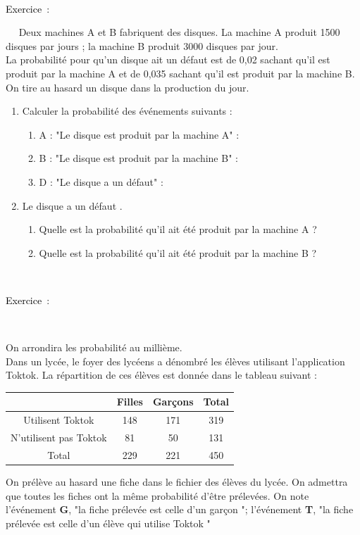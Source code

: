 \documentclass[11pt,a4paper]{article}
\newcounter{numexos}%
\newcommand{\exercice}[1]{%
\addtocounter{numexos}{1}%
\textcolor{black}{\normalsize Exercice\,\thenumexos\,}\,#1%
}
\newcommand{\bex}[2]
{\begin{bclogo}[couleur = white,logo= , barre=none,  arrondi = 0.1]
{~\exercice:~~{#1}}
~~
{#2}
~~
\end{bclogo}}
\begin{document}
\bex{}{
Deux machines A et B fabriquent des disques. La machine A produit 1500 disques par jours ; la machine B produit 3000 disques par jour. \\
La probabilité pour qu'un disque ait un défaut est de 0,02 sachant qu'il est produit par la machine A et de 0,035 sachant qu'il est produit par la machine B. On tire au hasard un disque dans la production du jour. 
}

\begin{enumerate}
    \item Calculer la probabilité des événements suivants : 
    \begin{enumerate}
        \item A : "Le disque est produit par la machine A" : \dotfill 
        \vspace{3mm}
        \item B : "Le disque est produit par la machine B" : \dotfill 
        \vspace{3mm}
        \item D : "Le disque a un défaut" : \dotfill 
    \end{enumerate}
    \item Le disque a un défaut .
    \begin{enumerate}
        \item Quelle est la probabilité qu'il ait été produit par la machine A ? \dotfill 
        \vspace{3mm}
        \item Quelle est la probabilité qu'il ait été produit par la machine B ? \dotfill 
    \end{enumerate}

\end{enumerate}

\vspace{3mm}

\bex{}{
On arrondira les probabilité au millième. \\
Dans un lycée, le foyer des lycéens a dénombré les élèves utilisant l'application Toktok. La répartition de ces élèves est donnée dans le tableau suivant : 
\begin{center}

        \begin{tabular}{|c|c|c|c|}
        \hline
             & Filles   & Garçons  & Total  \\
        \hline
            Utilisent Toktok & 148 & 171 & 319 \\
        \hline
             N'utilisent pas Toktok & 81 & 50 & 131 \\
        \hline
             Total & 229 & 221  & 450 \\
        \hline
        \end{tabular}

\end{center}
On prélève au hasard une fiche dans le fichier des élèves du lycée. On admettra que toutes les fiches ont la même probabilité d'être prélevées. On note l’événement \textbf{G}, "la fiche prélevée est celle d'un garçon ";  l’événement \textbf{T}, "la fiche prélevée est celle d'un élève qui utilise Toktok "  
}
\end{document}
